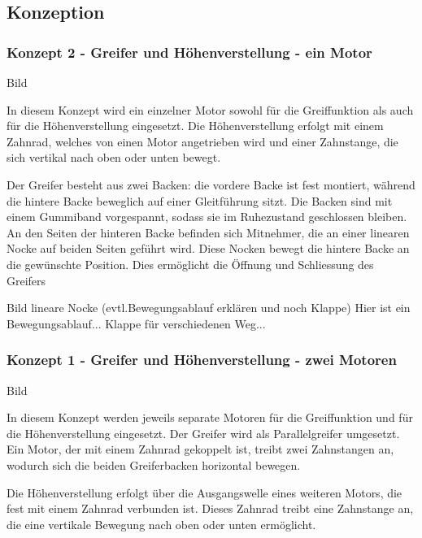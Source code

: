 \documentclass[main.tex]{subfiles} %
\begin{document}
\newpage

\subsection*{Konzeption}

\subsubsection*{Konzept 2 - Greifer und Höhenverstellung - ein Motor}

Bild \newline

In diesem Konzept wird ein einzelner Motor sowohl für die Greiffunktion als auch für die Höhenverstellung eingesetzt. 
Die Höhenverstellung erfolgt mit einem Zahnrad, welches von einen Motor angetrieben wird und einer Zahnstange, die
sich vertikal nach oben oder unten bewegt.

Der Greifer besteht aus zwei Backen: die vordere Backe ist fest montiert, während die hintere Backe beweglich 
auf einer Gleitführung sitzt. Die Backen sind mit einem Gummiband vorgespannt, sodass sie im Ruhezustand 
geschlossen bleiben. An den Seiten der hinteren Backe befinden sich Mitnehmer, die an einer linearen Nocke 
auf beiden Seiten geführt wird. Diese Nocken bewegt die hintere Backe an die gewünschte Position.
Dies ermöglicht die Öffnung und Schliessung des Greifers \newline


Bild lineare Nocke (evtl.Bewegungsablauf erklären und noch Klappe) \newline
Hier ist ein Bewegungsablauf... Klappe für verschiedenen Weg...


\subsubsection*{Konzept 1 - Greifer und Höhenverstellung - zwei Motoren}

Bild \newline

In diesem Konzept werden jeweils separate Motoren für die Greiffunktion und für die Höhenverstellung eingesetzt. 
Der Greifer wird als Parallelgreifer umgesetzt. Ein Motor, der mit einem Zahnrad gekoppelt ist, treibt zwei 
Zahnstangen an, wodurch sich die beiden Greiferbacken horizontal bewegen.

Die Höhenverstellung erfolgt über die Ausgangswelle eines weiteren Motors, die fest mit einem Zahnrad verbunden ist.
Dieses Zahnrad treibt eine Zahnstange an, die eine vertikale Bewegung nach oben oder unten ermöglicht.
\end{document}
